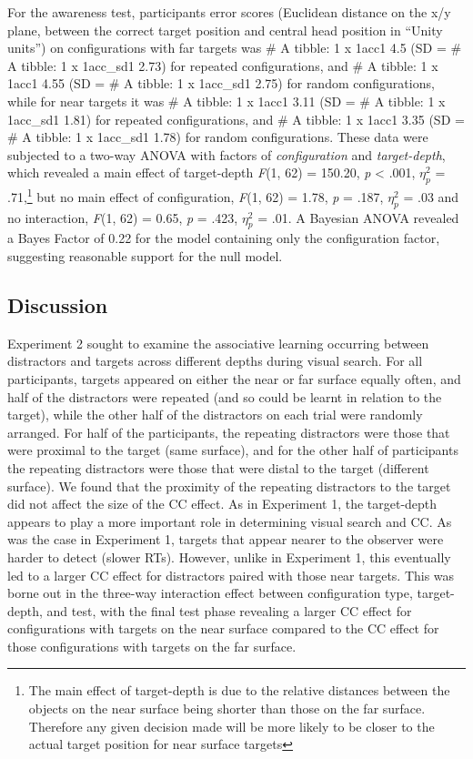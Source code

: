 \documentclass[
  english,
  man,floatsintext]{apa7}
\begin{document}
For the awareness test, participants error scores (Euclidean distance on the x/y plane, between the correct target position and central head position in ``Unity units'') on configurations with far targets was \# A tibble: 1 x 1acc1 4.5 (SD = \# A tibble: 1 x 1acc\_sd1 2.73) for repeated configurations, and \# A tibble: 1 x 1acc1 4.55 (SD = \# A tibble: 1 x 1acc\_sd1 2.75) for random configurations, while for near targets it was \# A tibble: 1 x 1acc1 3.11 (SD = \# A tibble: 1 x 1acc\_sd1 1.81) for repeated configurations, and \# A tibble: 1 x 1acc1 3.35 (SD = \# A tibble: 1 x 1acc\_sd1 1.78) for random configurations. These data were subjected to a two-way ANOVA with factors of \emph{configuration} and \emph{target-depth}, which revealed a main effect of target-depth \emph{F}(1, 62) = 150.20, \emph{p} \textless{} .001, \(\eta^2_p\) = .71,\footnote{The main effect of target-depth is due to the relative distances between the objects on the near surface being shorter than those on the far surface. Therefore any given decision made will be more likely to be closer to the actual target position for near surface targets} but no main effect of configuration, \emph{F}(1, 62) = 1.78, \emph{p} = .187, \(\eta^2_p\) = .03 and no interaction, \emph{F}(1, 62) = 0.65, \emph{p} = .423, \(\eta^2_p\) = .01. A Bayesian ANOVA revealed a Bayes Factor of 0.22 for the model containing only the configuration factor, suggesting reasonable support for the null model.

\hypertarget{discussion-1}{%
\subsection{Discussion}\label{discussion-1}}

Experiment 2 sought to examine the associative learning occurring between distractors and targets across different depths during visual search. For all participants, targets appeared on either the near or far surface equally often, and half of the distractors were repeated (and so could be learnt in relation to the target), while the other half of the distractors on each trial were randomly arranged. For half of the participants, the repeating distractors were those that were proximal to the target (same surface), and for the other half of participants the repeating distractors were those that were distal to the target (different surface). We found that the proximity of the repeating distractors to the target did not affect the size of the CC effect. As in Experiment 1, the target-depth appears to play a more important role in determining visual search and CC. As was the case in Experiment 1, targets that appear nearer to the observer were harder to detect (slower RTs). However, unlike in Experiment 1, this eventually led to a larger CC effect for distractors paired with those near targets. This was borne out in the three-way interaction effect between configuration type, target-depth, and test, with the final test phase revealing a larger CC effect for configurations with targets on the near surface compared to the CC effect for those configurations with targets on the far surface.
\end{document}
